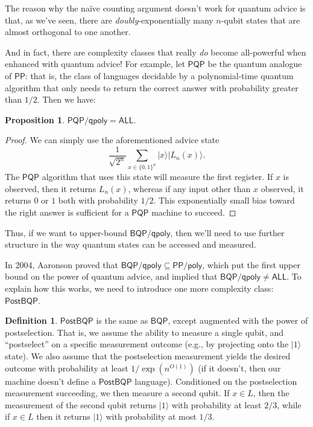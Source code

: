 \documentclass[11pt]{report}
\theoremstyle{plain}
\newtheorem{proposition}[theorem]{Proposition}
\theoremstyle{definition}
\newtheorem{definition}[theorem]{Definition}
\renewcommand{\ket}[1]{|#1\rangle}
\begin{document}
The reason why the na\"{i}ve counting argument doesn't work for quantum advice is that, as we've seen, there are {\em doubly}-exponentially many $n$-qubit states that are almost orthogonal to one another.

And in fact, there are complexity classes that really {\em do} become all-powerful when enhanced with quantum advice!  For example, let $\mathsf{PQP}$ be the quantum analogue of $\mathsf{PP}$: that is, the class of languages decidable by a polynomial-time quantum algorithm that only needs to return the correct answer with probability greater than $1/2$.  Then we have:

\begin{proposition}
  $\mathsf{PQP/qpoly} = \mathsf{ALL}.$
\end{proposition}
\begin{proof}
We can simply use the aforementioned advice state
$$ \frac{1}{\sqrt{2^n}} \sum_{x \in \{ 0, 1 \}^n}\ket{ x} \ket{ L_n( x) }. $$
The $\mathsf{PQP}$ algorithm that uses this state will measure the first register.  If $x$ is observed, then it returns $L_n( x)$, whereas if any input other than $x$ observed, it returns $0$ or $1$ both with probability $1/2$.
This exponentially small bias toward the right answer is sufficient for a $\mathsf{PQP}$ machine to succeed.
\end{proof}

Thus, if we want to upper-bound $\mathsf{BQP/qpoly}$, then we'll need to use further structure in the way quantum states can be accessed and measured.

In 2004, Aaronson \cite{aar:adv} proved that $\mathsf{BQP/qpoly} \subseteq \mathsf{PP/poly}$, which put the first upper bound on the power of quantum advice, and implied that $\mathsf{BQP/qpoly} \neq \mathsf{ALL}$.  To explain how this works, we need to introduce one more complexity class: $\mathsf{PostBQP}$.

\begin{definition} $\mathsf{PostBQP}$
is the same as $\mathsf{BQP}$, except augmented with the power of postselection.
That is, we assume the ability to measure a single qubit, and ``postselect'' on a specific measurement outcome (e.g., by projecting onto
the $\ket{1}$ state).  We also assume that the postselection measurement yields the desired outcome with probability at least $1/\exp(n^{O(1)})$ (if it doesn't, then our machine doesn't define a $\mathsf{PostBQP}$ language).  Conditioned on the postselection measurement succeeding, we then measure a second qubit.  If $x\in L$, then the measurement of the second qubit returns $\ket{1}$ with probability at least $2/3$, while if $x\in L$
then it returns $\ket{1}$ with probability at most $1/3$.
\end{definition}
\end{document}
